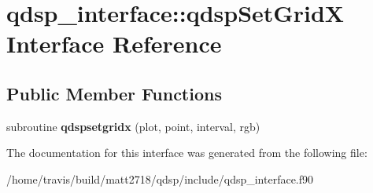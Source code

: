\hypertarget{interfaceqdsp__interface_1_1qdspSetGridX}{\section{qdsp\-\_\-interface\-:\-:qdsp\-Set\-Grid\-X Interface Reference}
\label{interfaceqdsp__interface_1_1qdspSetGridX}
}
\subsection*{Public Member Functions}
\begin{DoxyCompactItemize}
\item 
\hypertarget{interfaceqdsp__interface_1_1qdspSetGridX_a669c2fe5e1d67968f077c492b269a23e}{subroutine {\bfseries qdspsetgridx} (plot, point, interval, rgb)}\label{interfaceqdsp__interface_1_1qdspSetGridX_a669c2fe5e1d67968f077c492b269a23e}

\end{DoxyCompactItemize}


The documentation for this interface was generated from the following file\-:\begin{DoxyCompactItemize}
\item 
/home/travis/build/matt2718/qdsp/include/qdsp\-\_\-interface.\-f90\end{DoxyCompactItemize}
